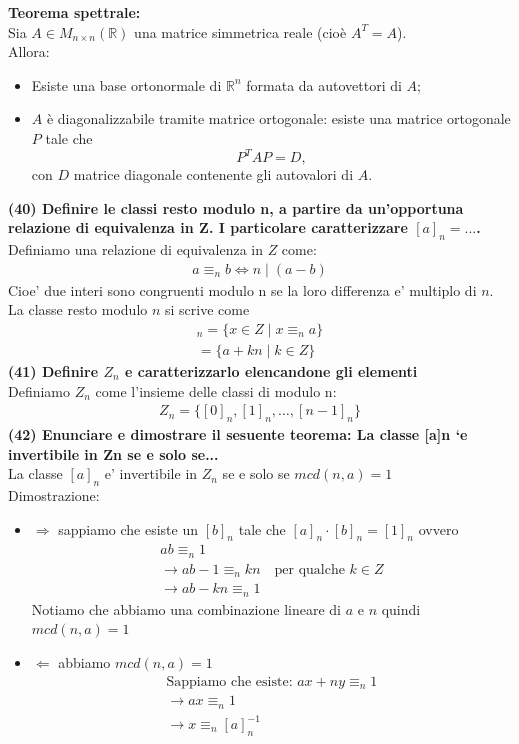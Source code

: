 \documentclass[10pt]{extarticle}
\begin{document}
\textbf{Teorema spettrale:} \\
Sia \( A \in M_{n \times n}(\mathbb{R}) \) una matrice simmetrica reale (cioè \( A^T = A \)). \\
Allora:
\begin{itemize}
    \item Esiste una base ortonormale di \( \mathbb{R}^n \) formata da autovettori di \( A \);
    \item \( A \) è diagonalizzabile tramite matrice ortogonale: esiste una matrice ortogonale \( P \) tale che
    \[
    P^T A P = D,
    \]
    con \( D \) matrice diagonale contenente gli autovalori di \( A \).
\end{itemize}
\vspace{1em}
\textbf{(40) Definire le classi resto modulo n, a partire da un’opportuna relazione di equivalenza in Z. I particolare caratterizzare $[a]_n = {...}$.}
Definiamo una relazione di equivalenza in $Z$ come:
\begin{align*}
    a \equiv_n b \iff n \mid (a-b)
\end{align*}
Cioe' due interi sono congruenti modulo n se la loro differenza e' multiplo di $n$.
La classe resto modulo $n$ si scrive come
\begin{align*}
    [a]_n = \{x \in Z \mid x \equiv_n a\} \\
    =\{a+kn \mid k \in Z\}
\end{align*}
\vspace{1em}
\textbf{(41) Definire $Z_n$ e caratterizzarlo elencandone gli elementi} \\
Definiamo $Z_n$ come l'insieme delle classi di modulo n:
\begin{align*}
    Z_n = \{[0]_n, [1]_n, \dots , [n-1]_n\}
\end{align*}
\vspace{1em}
\textbf{(42) Enunciare e dimostrare il sesuente teorema: La classe [a]n `e invertibile in Zn se e solo se...} \\
La classe $[a]_n$ e' invertibile in $Z_n$ se e solo se $mcd(n,a)=1$ \\
Dimostrazione:
\begin{itemize}
    \item $\Rightarrow$
    sappiamo che esiste un $[b]_n$ tale che $[a]_n \cdot [b]_n = [1]_n$ ovvero
    \begin{align*}
        ab \equiv_n 1 \\ 
        \to ab-1 \equiv_n kn \quad \text{per qualche } k \in Z \\
        \to ab -kn \equiv_n 1
    \end{align*}
    Notiamo che abbiamo una combinazione lineare di $a$ e $n$ quindi $mcd(n,a)=1$
    \item $\Leftarrow$ abbiamo $mcd(n,a)=1$
    \begin{align*}
        \text{Sappiamo che esiste: } ax+ny \equiv_n 1 \\
        \to ax \equiv_n 1 \\
        \to x \equiv_n [a]_n^{-1}
    \end{align*}
\end{itemize}
\end{document}
